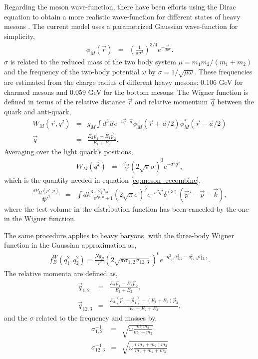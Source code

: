 Regarding the meson wave-function, there have been efforts using the Dirac equation to obtain a more realistic wave-function for different states of heavy mesons \cite{Zhao:2018jlw,PhysRevD.88.014021}.
The current model uses a parametrized Gaussian wave-function for simplicity,
\begin{eqnarray}
\phi_M(\vec{r}) &=& \left(\frac{1}{\pi \sigma^2}\right)^{3/4} e^{-\frac{r^2}{2\sigma^2}}.
\end{eqnarray}
$\sigma$ is related to the reduced mass of the two body system $\mu = m_1 m_2/(m_1+m_2)$ and the frequency of the  two-body potential $\omega$ by $\sigma = 1/\sqrt{\mu \omega}$.
These frequencies are estimated from the charge radius of different heavy mesons: $0.106$ GeV for charmed mesons and $0.059$ GeV for the bottom mesons.
The Wigner function is defined in terms of the relative distance $\vec{r}$ and relative momentum $\vec{q}$ between the quark and anti-quark,
\begin{eqnarray}
W_M(\vec{r}, q^2) &=& g_M \int d^3 \vec{a} e^{-i\vec{q}\cdot \vec{a}} \phi_M(\vec{r}+\vec{a}/2) \phi_M^*(\vec{r}-\vec{a}/2) \\
\vec{q} &=& \frac{E_2\vec{p}_1 - E_1\vec{p}_2}{E_1+E_2}.
\end{eqnarray} 
Averaging over the light quark's positions,
\begin{eqnarray}
W_M(q^2) &=& \frac{g_M}{V} (2\sqrt{\pi}\sigma)^3 e^{-\sigma^2 q^2},
\end{eqnarray}
which is the quantity needed in equation \ref{eq:meson_recombine},
\begin{eqnarray}
\frac{dP_M(p',p)}{dp'^3} &=& \int dk^3 \frac{g_q g_M}{e^{\beta p\cdot u} + 1} (2\sqrt{\pi}\sigma)^3 e^{-\sigma^2 q^2} \delta^{(3)}(\vec{p}'-\vec{p}-\vec{k}),
\end{eqnarray}
where the test volume in the distribution function has been canceled by the one in the Wigner function.

The same procedure applies to heavy baryons, with the three-body Wigner function in the Gaussian approximation as,
\begin{eqnarray}
f_B^W(q_1^2, q_2^2) = \frac{N g_B}{V^2} (2\sqrt{\pi\sigma_{1,2}\sigma_{12,3}})^6 e^{-q_{1,2}^2 \sigma_{1,2}^2 - q_{12,3}^2 \sigma_{12,3}^2}.
\end{eqnarray}
The relative momenta are defined as,
\begin{eqnarray}
\vec{q}_{1,2} &=& \frac{E_2 \vec{p}_1 -E_1\vec{p}_2}{E_1+E_2},\\
\vec{q}_{12,3} &=& \frac{E_3 (\vec{p}_1+\vec{p}_1) - (E_1+E_2)\vec{p}_3}{E_1+E_2 + E_3},
\end{eqnarray}
and the $\sigma$ related to the frequency and masses by,
\begin{eqnarray}
\sigma_{1,2}^{-1} &=& \sqrt{\omega \frac{m_1m_2}{m_1+m_2}}\\
\sigma_{12,3}^{-1} &=& \sqrt{\omega \frac{(m_1+m_2)m_3}{m_1+m_2+m_3}}
\end{eqnarray}

